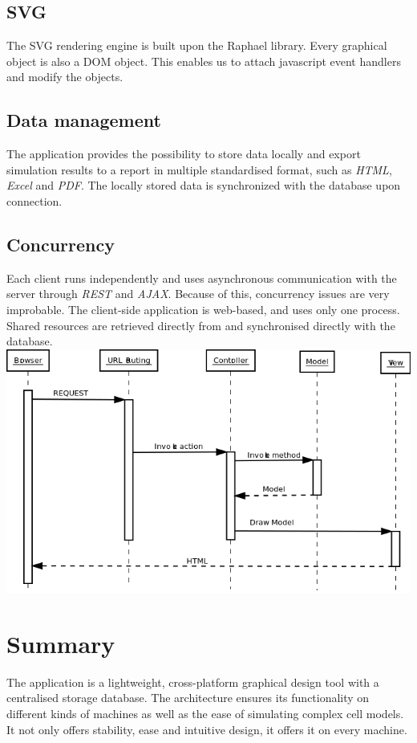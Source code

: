 \documentclass{report}
\begin{document}
		\subsection{SVG}
			The SVG rendering engine is built upon the Raphael library. Every graphical object is also a DOM object. This enables us to attach javascript event handlers and modify the objects.
		\subsection{Data management}
			The application provides the possibility to store data locally and export simulation results to a report in multiple standardised format, such as \emph{HTML}, \emph{Excel} and \emph{PDF}.
			The locally stored data is synchronized with the database upon connection. 
		\subsection{Concurrency}
			Each client runs independently and uses asynchronous communication with the server through \emph{REST} and \emph{AJAX}. Because of this, concurrency issues are very improbable. The client-side application is web-based, and uses only one process. Shared resources are retrieved directly from and synchronised directly with the database.\\
			
			\includegraphics[scale=0.5]{SequenceDiagramLife.png} 
	\clearpage
	\section{Summary}
		The application is a lightweight, cross-platform graphical design tool with a centralised storage database. The architecture ensures its functionality on different kinds of machines as well as the ease of simulating complex cell models. It not only offers stability, ease and intuitive design, it offers it on every machine.
\end{document}
